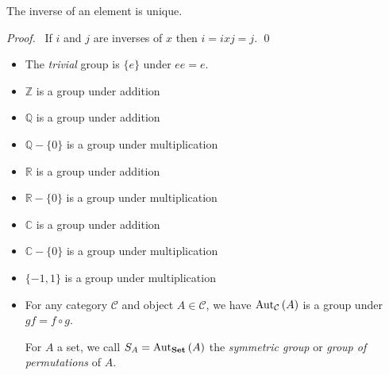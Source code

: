 \begin{prop}
    \label{prop:grp-inv-unique}
    The inverse of an element is unique.
\end{prop}

\begin{proof}
    \pf\ If $i$ and $j$ are inverses of $x$ then $i = ixj = j$. \qed
\end{proof}

\begin{ex}
    \begin{itemize}
        \item
              The \emph{trivial} group is $\{e\}$ under $ee = e$.
        \item $\mathbb{Z}$ is a group under addition %
        \item $\mathbb{Q}$ is a group under addition %
        \item $\mathbb{Q} - \{0\}$ is a group under multiplication
        \item $\mathbb{R}$ is a group under addition %
        \item $\mathbb{R} - \{0\}$ is a group under multiplication
        \item $\mathbb{C}$ is a group under addition %
        \item $\mathbb{C} - \{0\}$ is a group under multiplication
        \item $\{-1,1\}$ is a group under multiplication
        \item For any category $\mathcal{C}$ and object $A \in \mathcal{C}$, we have
              $\mathrm{Aut}_{\mathcal{C}} \left( {A} \right)$ is a group under $gf = f \circ g$.

              For $A$ a set, we call $S_A = \mathrm{Aut}_{\mathbf{Set}} \left( {A} \right)$ the \emph{symmetric group} or
              \emph{group of permutations} of $A$.


\end{itemize}
\end{ex}
